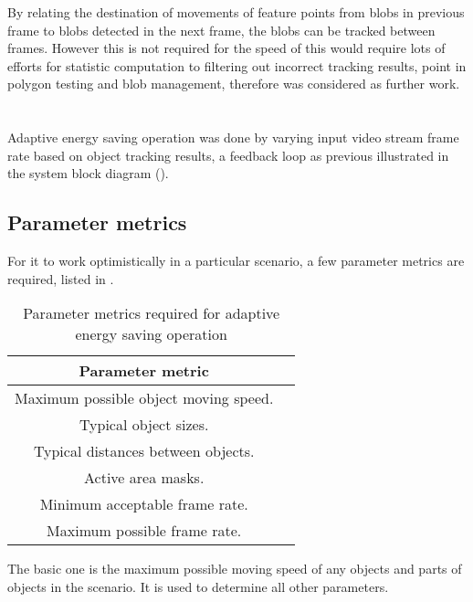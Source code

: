 By relating the destination of movements of feature points from blobs in previous frame to blobs detected in the next frame, the blobs can be tracked between frames. However this is not required for  the  speed of  this would  require lots of efforts for statistic computation to filtering out incorrect tracking results, point in polygon testing  and blob management, therefore was considered as further work.

\section{}

Adaptive energy saving operation was done by varying input video stream frame rate based on object tracking results, a feedback loop as previous illustrated in the system block diagram ().

\subsection{Parameter metrics}

For it to work optimistically in a particular scenario, a few parameter metrics are required, listed in .

\begin{table}[H]
  \centering
  \begin{tabular}{cc}
  \toprule
  \textbf{Parameter metric} \\
  \midrule
  Maximum possible object moving speed. \\
  Typical object sizes. \\
  Typical distances between objects. \\
  Active area masks. \\
  Minimum acceptable frame rate. \\
  Maximum possible frame rate. \\
  \bottomrule
  \end{tabular}
  \caption{Parameter metrics required for adaptive energy saving operation}
  \label{imp:ada:par}
\end{table}

The basic one is the maximum possible moving speed of any objects and parts of objects in the scenario. It is used to determine all other parameters.

